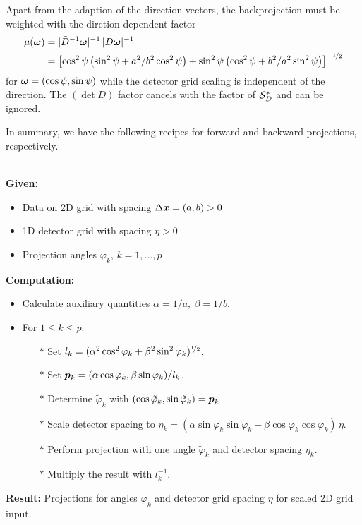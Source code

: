 \documentclass{amsart}
\renewcommand*{\phi}{\varphi}
\begin{document}
%
Apart from the adaption of the direction vectors, the backprojection must be weighted with the dirction-dependent factor
%
\begin{align*}
 \mu({\boldsymbol{\omega}}) 
 &= |\tilde D^{-1} {\boldsymbol{\omega}}|^{-1}\, |D {\boldsymbol{\omega}}|^{-1} \\
 &= \left[\cos^2\psi \left(\sin^2\psi + a^2/b^2 \cos^2\psi\right) + \sin^2\psi \left(\cos^2\psi + b^2/a^2 
 \sin^2\psi\right)\right]^{-{\nicefrac{1}{2}}}
\end{align*}
%
for ${\boldsymbol{\omega}} = (\cos\psi, \sin\psi)$ while the detector grid scaling is independent of the direction. The $(\det D)$ factor cancels with 
the factor of ${\mathcal{S}}_D^*$ and can be ignored.

In summary, we have the following recipes for forward and backward projections, respectively.

\begin{algorithm}~\\[2ex]
 \textbf{Given:}
 \begin{itemize}
  \item Data on 2D grid with spacing $\Delta{\boldsymbol{x}} = (a, b) > 0$
  \item 1D detector grid with spacing $\eta > 0$
  \item Projection angles $\phi_k$, $k = 1, \ldots, p$
 \end{itemize}
 \vspace*{2ex}
 \textbf{Computation:}
 \begin{itemize}
  \item Calculate auxiliary quantities $\alpha = 1 / a,\ \beta = 1 / b$.
  \item For $1 \leq k \leq p$:
  \begin{itemize}
   \item[$\ast$] Set $l_k = (\alpha^2 \cos^2\phi_k + \beta^2 \sin^2\phi_k)^{\nfhalf}$.
   \item[$\ast$] Set $\Bp_k = (\alpha \cos\phi_k, \beta \sin\phi_k) / l_k$.
   \item[$\ast$] Determine $\tilde\phi_k$ with $(\cos\tilde\phi_k, \sin\tilde\phi_k) = \Bp_k$.
   \item[$\ast$] Scale detector spacing to $\eta_k = (\alpha \sin\phi_k \sin\tilde\phi_k + \beta \cos\phi_k \cos\tilde\phi_k)\, \eta$.
   \item[$\ast$] Perform projection with one angle $\tilde\phi_k$ and detector spacing $\eta_k$.
   \item[$\ast$] Multiply the result with $l_k^{-1}$.
  \end{itemize}
 \end{itemize}
 \vspace*{2ex}
 \textbf{Result:} Projections for angles $\phi_k$ and detector grid spacing $\eta$ for scaled 2D grid input.
\end{algorithm}
\end{document}
